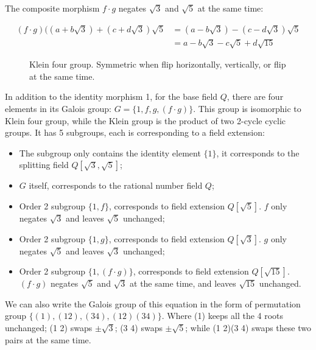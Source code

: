 \documentclass{article}
\begin{document}
The composite morphism $f \cdot g$ negates $\sqrt{3}$ and $\sqrt{5}$ at the same time:

\[
\begin{array}{rl}
(f \cdot g)((a + b\sqrt{3}) + (c + d\sqrt{3}) \sqrt {5} & = (a - b\sqrt{3}) - (c - d\sqrt{3})\sqrt{5} \\
 & = a - b\sqrt{3} - c\sqrt{5} + d\sqrt{15}
\end{array}
\]

\begin{figure}
\centering
{}
\captionsetup{labelformat=empty}
\caption{Klein four group. Symmetric when flip horizontally, vertically, or flip at the same time.}
\label{fig:Klein-four-group}
\end{figure}

In addition to the identity morphism 1, for the base field $Q$, there are four elements in its Galois group: $G = \{1, f, g, (f \cdot g)\}$. This group is isomorphic to Klein four group, while the Klein group is the product of two 2-cycle cyclic groups. It has 5 subgroups, each is corresponding to a field extension:

\begin{itemize}
\item The subgroup only contains the identity element $\{1\}$, it corresponds to the splitting field $Q[\sqrt{3}, \sqrt{5}]$;
\item $G$ itself, corresponds to the rational number field $Q$;
\item Order 2 subgroup $\{1, f\}$, corresponds to field extension $Q[\sqrt{5}]$. $f$ only negates $\sqrt{3}$ and leaves $\sqrt{5}$ unchanged;
\item Order 2 subgroup $\{1, g\}$, corresponds to field extension $Q[\sqrt{3}]$. $g$ only negates $\sqrt{5}$ and leaves $\sqrt{3}$ unchanged;
\item Order 2 subgroup $\{1, (f \cdot g)\}$, corresponds to field extension $Q[\sqrt{15}]$. $(f \cdot g)$ negates $\sqrt{5}$ and $\sqrt{3}$ at the same time, and leaves $\sqrt{15}$ unchanged.
\end{itemize}

We can also write the Galois group of this equation in the form of permutation group $\{(1), (1 2), (3 4), (1 2)(3 4)\}$. Where (1) keeps all the 4 roots unchanged; (1 2) swaps $\pm \sqrt{3}$; (3 4) swaps $\pm \sqrt{5}$; while (1 2)(3 4) swaps these two pairs at the same time.
\end{document}

